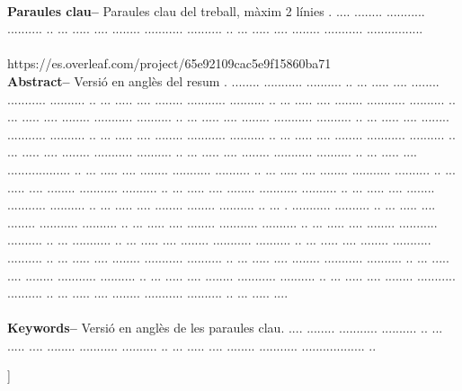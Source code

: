 ﻿\documentclass[10pt,a4paper,twocolumn,twoside]{article}
\begin{document}
\begin{@twocolumnfalse}
\begin{center}
{\\
\textbf{Paraules clau-- } Paraules clau del treball, màxim 2 línies . .... ........ ........... .......... ..  ... ..... .... ........ ........... .......... ..  ... ..... .... ........ ........... ................\\
\\https://es.overleaf.com/project/65e92109cac5e9f15860ba71
\bigskip
\\
\textbf{Abstract--} Versió en anglès del resum . ........ ........... .......... ..  ... ..... .... ........ ........... .......... ..  ... ..... .... ........ ........... .......... ..  ... ..... .... ........ ........... .......... ..  ... ..... .... ........ ........... .......... ..  ... ..... .... ........ ........... .......... ..  ... ..... .... ........ ........... .......... ..  ... ..... .... ........ ........... .......... ..  ... ..... .... ........ ........... .......... ..  ... ..... .... ........ ........... .......... ..  ... ..... .... ........ ........... .......... ..  ... ..... .... .................. ..  ... ..... .... ........ ........... .......... ..  ... ..... .... ........ ........... .......... ..  ... ..... .... ........ ........... .......... ..  ... ..... .... ........ ........... .......... ..  ... ..... .... ........ ........... .......... ..  ... ..... .... ........ ........ .......... ..  ... . ........... .......... ..  ... ..... .... ........ ........... .......... ..  ... ..... .... ........ ........... .......... ..  ... ..... .... ........ ........... .......... ..  ... ........... ..  ... ..... .... ........ ........... .......... ..  ... ..... .... ........ ........... .......... ..  ... ..... .... ........ ........... .......... ..  ... ..... .... ........ ........... .......... ..  ... ..... .... ........ ........... .......... ..  ... ..... .... ........ ........... .......... ..  ... ..... .... ........ ........... .......... ..  ... ..... .... ........ ........... .......... ..  ... ..... .... 
\\
\\
\textbf{Keywords-- } Versió en anglès de les paraules clau. .... ........ ........... .......... ..  ... ..... .... ........ ........... .......... ..  ... ..... .... ........ ........... .................. ..\\
}

\bigskip

{\vrule depth 0pt height 0.5pt width 4cm\hspace{7.5pt}%
%
\hspace{7.5pt}\vrule depth 0pt height 0.5pt width 4cm\relax}

\end{center}

\bigskip
\end{@twocolumnfalse}]
\end{document}
